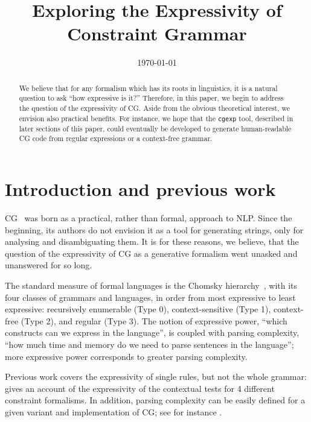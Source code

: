 \documentclass[11pt]{article}
\title{Exploring the Expressivity of Constraint Grammar}
\date{\today}
\begin{document}
\maketitle

\begin{abstract}
  We believe that for any formalism which has its roots in linguistics, it is a
  natural question to ask ``how expressive is it?'' Therefore, in this paper, we
  begin to address the question of the expressivity of CG.
  Aside from the obvious theoretical interest, we envision also practical
  benefits. For instance, we hope that the \texttt{cgexp} tool, described in
  later sections of this paper, could eventually be developed to generate
  human-readable CG code from regular expressions or a context-free grammar. 
\end{abstract}

\section{Introduction and previous work}

CG~\cite{karlsson1995constraint} was born as a practical, rather than formal, 
approach to NLP. 
Since the beginning, its authors do not envision it as a tool for 
generating strings, only for analysing and disambiguating them.
It is for these reasons, we believe, that the question of the expressivity of CG
as a generative formalism went unasked and unanswered for so long.

The standard measure of formal languages is the Chomsky
hierarchy~\cite{chomsky1956hierarchy}, with its four classes of grammars and
languages, in order from most expressive to least expressive: recursively
enumerable (Type 0), context-sensitive (Type 1), context-free (Type 2), and
regular (Type 3). The notion of expressive power, ``which constructs can we
express in the language'', is coupled with parsing complexity, ``how much time
and memory do we need to parse sentences in the language''; more expressive
power corresponds to greater parsing complexity.


Previous work covers the expressivity of single rules, but not the whole grammar: 
 gives an account of the expressivity of
the contextual tests for 4 different constraint formalisms. In addition, parsing
complexity can be easily defined for a given variant and implementation of CG;
see for instance .
\end{document}
